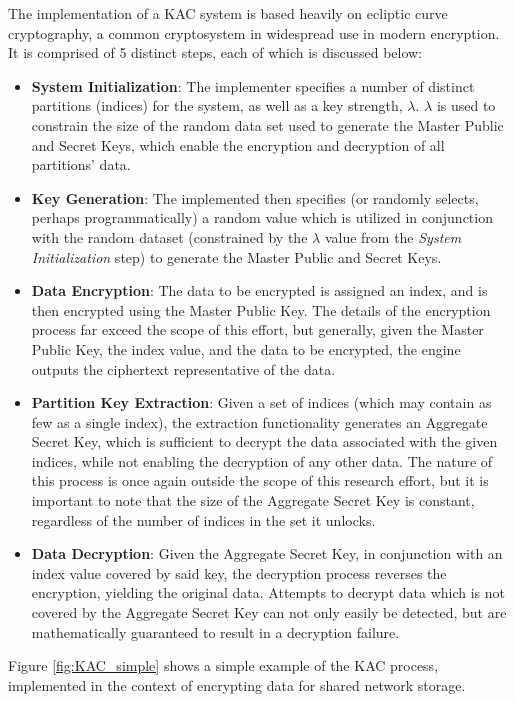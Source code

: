 The implementation of a KAC system is based heavily on ecliptic curve cryptography, a common cryptosystem in widespread use in modern encryption. It is comprised of 5 distinct steps, each of which is discussed below:
\begin{itemize}
    \item \textbf{System Initialization}: The implementer specifies a number of distinct partitions (indices) for the system, as well as a key strength, $\lambda$. $\lambda$ is used to constrain the size of the random data set used to generate the Master Public and Secret Keys, which enable the encryption and decryption of all partitions' data. 
    \item \textbf{Key Generation}: The implemented then specifies (or randomly selects, perhaps programmatically) a random value which is utilized in conjunction with the random dataset (constrained by the $\lambda$ value from the \textit{System Initialization} step) to generate the Master Public and Secret Keys. 
    \item \textbf{Data Encryption}: The data to be encrypted is assigned an index, and is then encrypted using the Master Public Key. The details of the encryption process far exceed the scope of this effort, but generally, given the Master Public Key, the index value, and the data to be encrypted, the engine outputs the ciphertext representative of the data.
    \item \textbf{Partition Key Extraction}: Given a set of indices (which may contain as few as a single index), the extraction functionality generates an Aggregate Secret Key, which is sufficient to decrypt the data associated with the given indices, while not enabling the decryption of any other data. The nature of this process is once again outside the scope of this research effort, but it is important to note that the size of the Aggregate Secret Key is constant, regardless of the number of indices in the set it unlocks.
    \item \textbf{Data Decryption}: Given the Aggregate Secret Key, in conjunction with an index value covered by said key, the decryption process reverses the encryption, yielding the original data. Attempts to decrypt data which is not covered by the Aggregate Secret Key can not only easily be detected, but are mathematically guaranteed to result in a decryption failure.   

\end{itemize}

Figure \ref{fig:KAC_simple} shows a simple example of the KAC process, implemented in the context of encrypting data for shared network storage.

